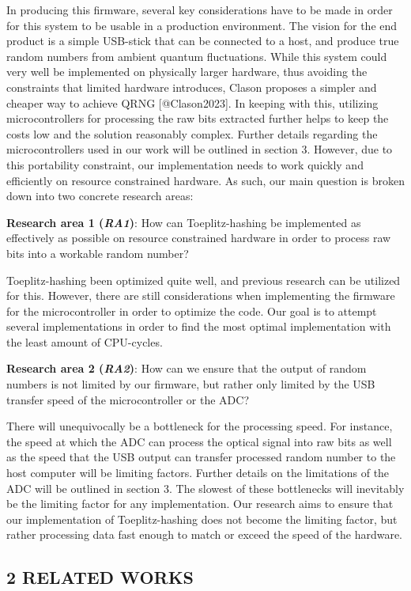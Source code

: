 \documentclass{sigchi}
\begin{document}
In producing this firmware, several key considerations have to be made
in order for this system to be usable in a production environment. The
vision for the end product is a simple USB-stick that can be connected
to a host, and produce true random numbers from ambient quantum
fluctuations. While this system could very well be implemented on
physically larger hardware, thus avoiding the constraints that limited
hardware introduces, Clason proposes a simpler and cheaper way to
achieve QRNG {[}@Clason2023{]}. In keeping with this, utilizing
microcontrollers for processing the raw bits extracted further helps to
keep the costs low and the solution reasonably complex. Further details
regarding the microcontrollers used in our work will be outlined in
section 3. However, due to this portability constraint, our
implementation needs to work quickly and efficiently on resource
constrained hardware. As such, our main question is broken down into two
concrete research areas:

\textbf{Research area 1 (\emph{RA1})}: How can Toeplitz-hashing be
implemented as effectively as possible on resource constrained hardware
in order to process raw bits into a workable random number?

Toeplitz-hashing been optimized quite well, and previous research can be
utilized for this. However, there are still considerations when
implementing the firmware for the microcontroller in order to optimize
the code. Our goal is to attempt several implementations in order to
find the most optimal implementation with the least amount of
CPU-cycles.

\textbf{Research area 2 (\emph{RA2})}: How can we ensure that the output
of random numbers is not limited by our firmware, but rather only
limited by the USB transfer speed of the microcontroller or the ADC?

There will unequivocally be a bottleneck for the processing speed. For
instance, the speed at which the ADC can process the optical signal into
raw bits as well as the speed that the USB output can transfer processed
random number to the host computer will be limiting factors. Further
details on the limitations of the ADC will be outlined in section 3. The
slowest of these bottlenecks will inevitably be the limiting factor for
any implementation. Our research aims to ensure that our implementation
of Toeplitz-hashing does not become the limiting factor, but rather
processing data fast enough to match or exceed the speed of the
hardware.

\subsection{2 RELATED WORKS}\label{related-works}
\end{document}
